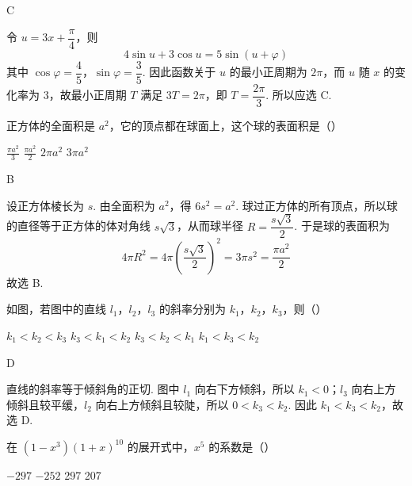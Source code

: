 \documentclass[UTF8,a4paper,oneside,11pt]{ctexbook}
\begin{document}
\begin{answer}
C
\end{answer}

\begin{solution}
令 \(u=3x+\dfrac{\pi}{4}\)，则
\[
4\sin u+3\cos u=5\sin\left(u+\varphi\right)
\]
其中 \(\cos\varphi=\dfrac45\)，\(\sin\varphi=\dfrac35\). 因此函数关于 \(u\) 的最小正周期为 \(2\pi\)，而 \(u\) 随 \(x\) 的变化率为 \(3\)，故最小正周期 \(T\) 满足 \(3T=2\pi\)，即 \(T=\dfrac{2\pi}{3}\). 所以应选 C.
\end{solution}

\begin{problem}
正方体的全面积是 \(a^2\)，它的顶点都在球面上，这个球的表面积是（\quad）

\choices
    {\(\frac{\pi a^2}{3}\)}
    {\(\frac{\pi a^{2}}{2} \)}
    {\(2\pi a^{2}\)}
    {\(3\pi a^{2}\)}
\end{problem}

\begin{answer}
B
\end{answer}

\begin{solution}
设正方体棱长为 \(s\). 由全面积为 \(a^2\)，得 \(6s^2=a^2\). 球过正方体的所有顶点，所以球的直径等于正方体的体对角线 \(s\sqrt3\)，从而球半径 \(R=\dfrac{s\sqrt3}{2}\). 于是球的表面积为
\[
4\pi R^2=4\pi\left(\frac{s\sqrt3}{2}\right)^2=3\pi s^2=\frac{\pi a^2}{2}
\]
故选 B.
\end{solution}

\begin{problem}
如图，若图中的直线 \(l_{1}\)，\(l_{2}\)，\(l_{3}\) 的斜率分别为 \(k_{1}\)，\(k_{2}\)，\(k_{3}\)，则（\quad）


\choices
    {\(k_{1} < k_{2} < k_{3}\)}
    {\(k_{3} < k_{1} < k_{2}\)}
    {\(k_{3} < k_{2} < k_{1}\)}
    {\(k_{1} < k_{3} < k_{2}\)}
\end{problem}

\begin{answer}
D
\end{answer}

\begin{solution}
直线的斜率等于倾斜角的正切. 图中 \(l_1\) 向右下方倾斜，所以 \(k_1<0\)；\(l_3\) 向右上方倾斜且较平缓，\(l_2\) 向右上方倾斜且较陡，所以 \(0<k_3<k_2\). 因此 \(k_1<k_3<k_2\)，故选 D.
\end{solution}

\begin{problem}
在 \((1 - x^{3})(1 + x)^{10}\) 的展开式中，\(x^{5}\) 的系数是（\quad）

\choices
    {\(-297\)}
    {\(-252\)}
    {297}
    {207}
\end{problem}
\end{document}
